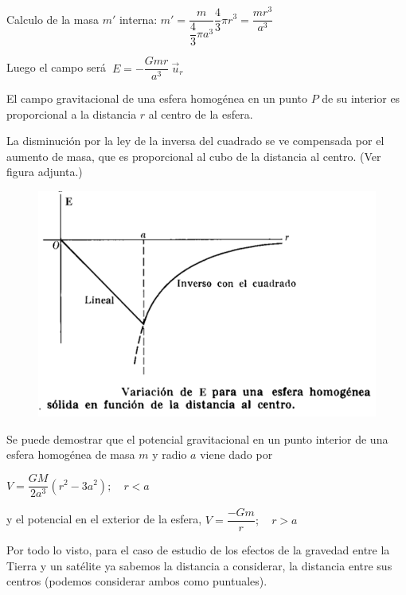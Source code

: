 Calculo de la masa $m'$ interna: $m'=\dfrac{m}{\dfrac 4 3 \pi a^3} \dfrac 4 3 \pi r^3=\dfrac{mr^3}{a^3}$

Luego el campo será $\ E=-\dfrac{Gmr}{a^3}\ \vec u_r$

\begin{multicols}{2}
El campo gravitacional de una esfera homogénea en un punto $P$ de su interior es proporcional a la distancia $r$ al centro de la esfera.

La disminución por la ley de la inversa del cuadrado se ve compensada por el aumento de masa, que es proporcional al cubo de la distancia al centro. (Ver figura adjunta.)
\begin{figure}[H]
	\centering
	\includegraphics[width=.55\textwidth]{imagenes/imagenes14/T14IM14.png}
\end{figure}
\end{multicols}

Se puede demostrar que el potencial gravitacional en un punto interior de una esfera homogénea de masa $m$ y radio $a$ viene dado por

$V=\dfrac{GM}{2a^3}\left( r^2-3a^2 \right);\quad r<a$ 

y el potencial en el exterior de la esfera, $V=\dfrac{-Gm}{r};\quad r>a$


Por todo lo visto, para el caso de estudio de los efectos de la gravedad entre la Tierra y un satélite ya sabemos la distancia a considerar, la distancia entre sus centros (podemos considerar ambos como puntuales).

